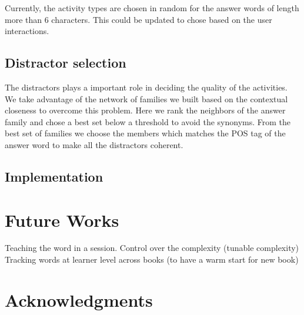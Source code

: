 \documentclass[11pt,a4paper]{article}
\begin{document}
Currently, the activity types are chosen in random for the answer words of length
more than 6 characters. This could be updated to chose based on the user
interactions.

\subsection{Distractor selection}
The distractors plays a important role in deciding the quality of the activities.
We take advantage of the network of families we built based on the contextual
closeness to overcome this problem. Here we rank the neighbors of the
answer family and chose a best set below a threshold to avoid the synonyms. From
the best set of families we choose the members which matches the POS tag of the
answer word to make all the distractors coherent.


\subsection{Implementation}

\section{Future Works}
Teaching the word in a session.
Control over the complexity (tunable complexity)
Tracking words at learner level across books (to have a warm start for new book)


\section*{Acknowledgments}

%
%


\end{document}
